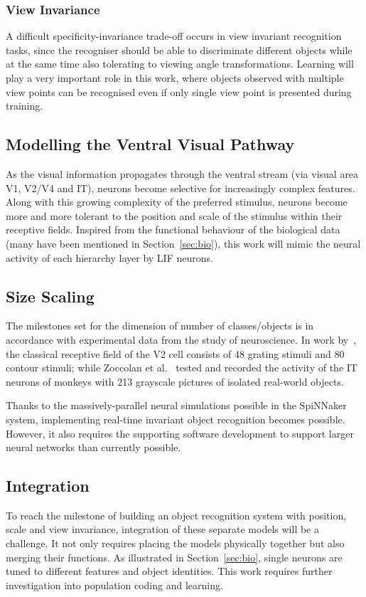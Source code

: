 \documentclass[journal]{journal}
\begin{document}
\subsubsection{View Invariance}
A difficult specificity-invariance trade-off occurs in view invariant recognition tasks, since the recogniser should be able to discriminate different objects while at the same time also tolerating to viewing angle transformations.
Learning will play a very important role in this work, where objects observed with multiple view points can be recognised even if only single view point is presented during training.
\subsection{Modelling the Ventral Visual Pathway}
As the visual information propagates through the ventral stream (via visual area V1, V2/V4 and IT), neurons become selective for increasingly complex features. 
Along with this growing complexity of the preferred stimulus, neurons become more and more tolerant to the position and scale of the stimulus within their receptive fields.
Inspired from the functional behaviour of the biological data (many have been mentioned in Section~\ref{sec:bio}), this work will mimic the neural activity of each hierarchy layer by LIF neurons.
 
\subsection{Size Scaling}
The milestones set for the dimension of number of classes/objects is in accordance with experimental data from the study of neuroscience.
In work by~\cite{hegde2004temporal}, the classical receptive field of the V2 cell consists of 48 grating stimuli and 80 contour stimuli; while Zoccolan et al.~\cite{zoccolan2007trade} tested and recorded the activity of the IT neurons of monkeys with 213 grayscale pictures of isolated real-world objects.

Thanks to the massively-parallel neural simulations possible in the SpiNNaker system, implementing real-time invariant object recognition becomes possible.
However, it also requires the supporting software development to support larger neural networks than currently possible.  
\subsection{Integration}
To reach the milestone of building an object recognition system with position, scale and view invariance, integration of these separate models will be a challenge.
It not only requires placing the models physically together but also merging their functions.
As illustrated in Section~\ref{sec:bio}, single neurons are tuned to different features and object identities.
This work requires further investigation into population coding and learning. 
\end{document}
